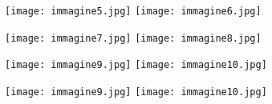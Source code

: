 \documentclass{article}
\begin{document}
\begin{figure}[H]
  \centering
  \texttt{[image: immagine5.jpg]}
  \hfill
  \texttt{[image: immagine6.jpg]}
\end{figure}

\begin{figure}[H]
  \centering
  \texttt{[image: immagine7.jpg]}
  \hfill
  \texttt{[image: immagine8.jpg]}
\end{figure}

\begin{figure}[H]
  \centering
  \texttt{[image: immagine9.jpg]}
  \hfill
  \texttt{[image: immagine10.jpg]}
\end{figure}

\begin{figure}[H]
  \centering
  \texttt{[image: immagine9.jpg]}
  \hfill
  \texttt{[image: immagine10.jpg]}
\end{figure}
\end{document}
